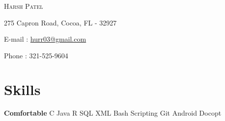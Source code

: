 \documentclass{my_resume_class}
\newcommand{\name}[1]{
   \centerline{\textsc{\huge{#1}}}
}
\newcommand{\contact}[1]{
   \centerline{\normalsize{#1}}
}
\begin{document}
\name{Harsh Patel}
\vspace{0.1cm}
\contact{275 Capron Road, Cocoa, FL - 32927}
\vspace{0.05cm}
\contact{E-mail : \href{mailto:hurr03@gmail.com}{hurr03@gmail.com}}
\vspace{0.05cm}
\contact{Phone : 321-525-9604 }

\section{Skills}
{\textbf{Comfortable}  \hspace{0.80cm} C\hspace{0.50cm} Java\hspace{0.50cm} R\hspace{0.50cm} SQL\hspace{0.50cm}  XML\hspace{0.50cm} Bash Scripting\hspace{0.50cm} Git\hspace{0.50cm} Android\hspace{0.50cm} Docopt } \\
\end{document}
